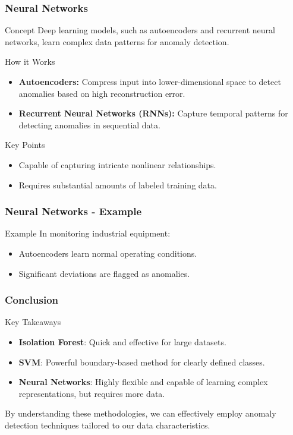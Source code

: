 \documentclass{beamer}
\begin{document}
\begin{frame}[fragile]
    \frametitle{Neural Networks}
    \begin{block}{Concept}
        Deep learning models, such as autoencoders and recurrent neural networks, learn complex data patterns for anomaly detection.
    \end{block}
    \begin{block}{How it Works}
        \begin{itemize}
            \item \textbf{Autoencoders:} Compress input into lower-dimensional space to detect anomalies based on high reconstruction error.
            \item \textbf{Recurrent Neural Networks (RNNs):} Capture temporal patterns for detecting anomalies in sequential data.
        \end{itemize}
    \end{block}
    \begin{block}{Key Points}
        \begin{itemize}
            \item Capable of capturing intricate nonlinear relationships.
            \item Requires substantial amounts of labeled training data.
        \end{itemize}
    \end{block}
\end{frame}

\begin{frame}[fragile]
    \frametitle{Neural Networks - Example}
    \begin{block}{Example}
        In monitoring industrial equipment:
        \begin{itemize}
            \item Autoencoders learn normal operating conditions.
            \item Significant deviations are flagged as anomalies.
        \end{itemize}
    \end{block}
\end{frame}

\begin{frame}[fragile]
    \frametitle{Conclusion}
    \begin{block}{Key Takeaways}
        \begin{itemize}
            \item \textbf{Isolation Forest}: Quick and effective for large datasets.
            \item \textbf{SVM}: Powerful boundary-based method for clearly defined classes.
            \item \textbf{Neural Networks}: Highly flexible and capable of learning complex representations, but requires more data.
        \end{itemize}
    \end{block}
    By understanding these methodologies, we can effectively employ anomaly detection techniques tailored to our data characteristics.
\end{frame}
\end{document}
